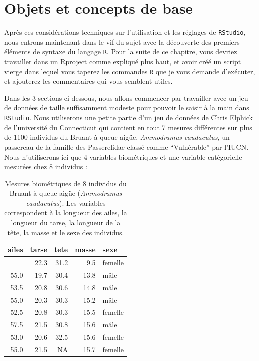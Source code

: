 \documentclass[
  a4paper,
  DIV=11,
  numbers=noendperiod,
  oneside]{scrreprt}
\begin{document}
\section{Objets et concepts de base}\label{sec-objects}

Après ces considérations techniques sur l'utilisation et les réglages de
\texttt{RStudio}, nous entrons maintenant dans le vif du sujet avec la
découverte des premiers éléments de syntaxe du langage \texttt{R}. Pour
la suite de ce chapitre, vous devriez travailler dans un Rproject comme
expliqué plus haut, et avoir créé un script vierge dans lequel vous
taperez les commandes \texttt{R} que je vous demande d'exécuter, et
ajouterez les commentaires qui vous semblent utiles.

Dans les 3 sections ci-dessous, nous allons commencer par travailler
avec un jeu de données de taille suffisamment modeste pour pouvoir le
saisir à la main dans \texttt{RStudio}. Nous utiliserons une petite
partie d'un jeu de données de Chris Elphick de l'université du
Connecticut qui contient en tout 7 mesures différentes sur plus de 1100
individus du Bruant à queue aigüe, \emph{Ammodramus caudacutus}, un
passereau de la famille des Passerelidae classé comme ``Vulnérable'' par
l'IUCN. Nous n'utiliserons ici que 4 variables biométriques et une
variable catégorielle mesurées chez 8 individus :

\begin{longtable}[]{@{}rrrrl@{}}

\caption{\label{tbl-bruant}Mesures biométriques de 8 individus du Bruant
à queue aigüe (\emph{Ammodramus caudacutus}). Les variables
correspondent à la longueur des ailes, la longueur du tarse, la longueur
de la tête, la masse et le sexe des individus.}

\tabularnewline

\toprule\noalign{}
ailes & tarse & tete & masse & sexe \\
\midrule\noalign{}
\endhead
\bottomrule\noalign{}
\endlastfoot
59.0 & 22.3 & 31.2 & 9.5 & femelle \\
55.0 & 19.7 & 30.4 & 13.8 & mâle \\
53.5 & 20.8 & 30.6 & 14.8 & mâle \\
55.0 & 20.3 & 30.3 & 15.2 & mâle \\
52.5 & 20.8 & 30.3 & 15.5 & femelle \\
57.5 & 21.5 & 30.8 & 15.6 & mâle \\
53.0 & 20.6 & 32.5 & 15.6 & femelle \\
55.0 & 21.5 & NA & 15.7 & femelle \\

\end{longtable}
\end{document}
